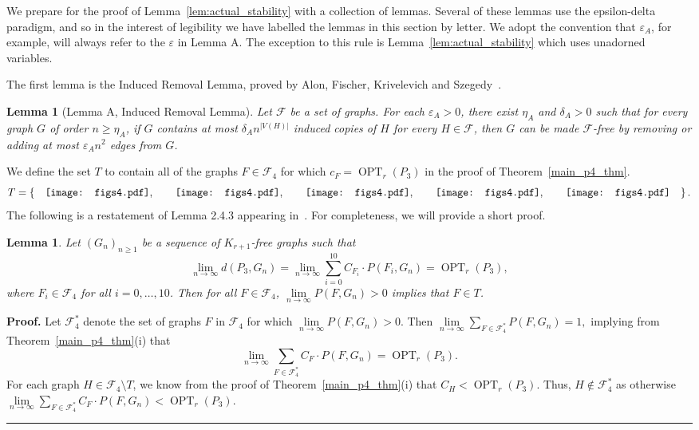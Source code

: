 \documentclass[12pt]{article}
\newtheorem{lemma}[thm]{Lemma}
\DeclareMathOperator{\OPT}{OPT}
\renewenvironment{proof}[1][Proof]{\textbf{#1.} }{\ \rule{0.5em}{0.5em}}
\newcommand{\vc}[1]{\ensuremath{\vcenter{\hbox{#1}}}}
\newcommand{\ffra}{\vc{\texttt{[image: figs4.pdf]}}}
\newcommand{\ffrd}{\vc{\texttt{[image: figs4.pdf]}}}
\newcommand{\ffrg}{\vc{\texttt{[image: figs4.pdf]}}}
\newcommand{\ffrh}{\vc{\texttt{[image: figs4.pdf]}}}
\newcommand{\ffri}{\vc{\texttt{[image: figs4.pdf]}}}
\begin{document}
We prepare for the proof of Lemma~\ref{lem:actual_stability} with a collection of
lemmas. Several of these lemmas use the epsilon-delta paradigm, and so in the
interest of legibility we have labelled the lemmas in this section by letter. We
adopt the convention that $\varepsilon_A$, for example, will always refer to the
$\varepsilon$ in Lemma A. The exception to this rule is
Lemma~\ref{lem:actual_stability} which uses unadorned variables.

The first lemma is the Induced Removal Lemma, proved by Alon, Fischer, Krivelevich and
Szegedy~\cite{Alon_efficienttesting_removlemma}.

\begin{lemma}[Lemma A, Induced Removal Lemma]\label{lem:removal_lemma}
Let $\mathcal{F}$ be a set of graphs. For each $\varepsilon_A > 0$, there exist
$\eta_A$ and $\delta_A > 0$ such that for every graph $G$ of order $n \geq
\eta_A$, if $G$ contains at most $\delta_A n^{|V(H)|}$ induced copies of $H$ for every
$H \in \mathcal{F}$, then $G$ can be made $\mathcal{F}$-free by removing or
adding at most $\varepsilon_A n^2$ edges from $G$. 
\end{lemma}

We define the set $T$ to contain all of the graphs $F \in
\mathcal{F}_4$ for which $c_F = \OPT_r(P_3)$ in the proof of Theorem~\ref{main_p4_thm}. 
\[
T = \left\{ \hspace{ 1 em} \ffra, \hspace{2 em} \ffrd, \hspace{2 em} \ffrg, \hspace{2 em} \ffrh, \hspace{2 em} \ffri \hspace{1 em }\right\}.
\]
The following is a restatement of Lemma 2.4.3 appearing in~\cite{baberthesis}. For completeness, we will provide a short proof.
\begin{lemma}{\cite{baberthesis}}\label{lem:baber thesis}
Let $(G_n)_{n \geq 1}$ be a sequence of $K_{r+1}$-free graphs such that 
\[ 
\lim\limits_{n \to \infty} d(P_3,G_n) = \lim\limits_{n \to \infty} \sum\limits_{i=0}^{10} C_{F_i} \cdot P(F_i,G_n) =  \OPT_r(P_3),
\]
where $F_i \in \mathcal{F}_4$ for all $i = 0,\dots, 10$. Then for all $F \in \mathcal{F}_4$, $\lim\limits_{n \to \infty} P(F,G_n) > 0$ implies that $F \in T$.
\end{lemma}

\begin{proof}
Let $\mathcal{F}_4^*$ denote the set of graphs $F$ in $\mathcal{F}_4$ for which $\lim\limits_{n \to \infty} P(F,G_n) > 0$. Then $
\lim\limits_{n \to \infty}\sum_{F \in \mathcal{F}_4^*} P(F,G_n) = 1,
$
implying  from Theorem~\ref{main_p4_thm}(i) that
\[ \lim\limits_{n \to \infty}\sum\limits_{F \in \mathcal{F}_4^*} C_F \cdot P(F,G_n) = \OPT_r(P_3).
\]
For each graph $H \in \mathcal{F}_4 \setminus T$, we know from the proof of Theorem~\ref{main_p4_thm}(i) that $C_H < \OPT_{r}(P_3)$. Thus, $H \notin \mathcal{F}_4^*$ as otherwise $\lim\limits_{n \to \infty}\sum_{F \in \mathcal{F}_4^*} C_F \cdot P(F,G_n) < \OPT_r(P_3).$
\end{proof}
\end{document}
